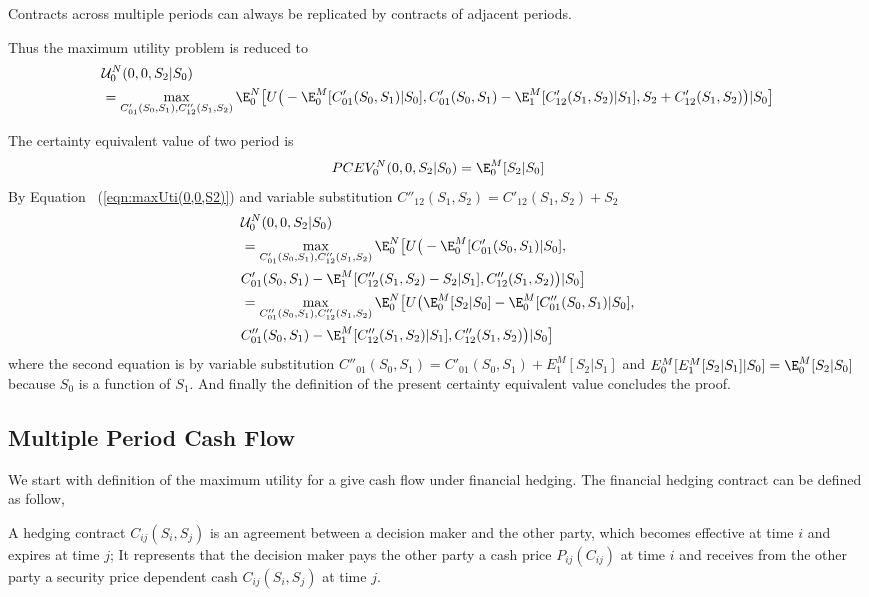 {\remark Contracts across multiple periods can always be replicated by contracts of adjacent periods.}

Thus the maximum utility problem is reduced to
\begin{align} \label{eqn:maxUti(0,0,S2)}
&\mathcal{U}^N_0 (0,0, S_2|S_0)\nonumber \\&= \max_{C'_{01}(S_0,S_1),C''_{12}(S_1,S_2)} \E_0^N \big{[}U\big{(} - \E_0^M[C'_{01}(S_0,S_1)|S_0] , C'_{01}(S_0,S_1) - \E_1^M[C'_{12}(S_1,S_2)|S_1], S_2+C'_{12}(S_1,S_2)\big{)} |S_0\big{]} 
\end{align}


{\lemma The certainty equivalent value of two period is
\[PCEV_0^N(0,0,S_2|S_0) = \E_0^M[S_2|S_0] \]
}
\proof By Equation~ (\ref{eqn:maxUti(0,0,S2)}) and variable substitution $C''_{12}(S_1,S_2) = C'_{12}(S_1,S_2) + S_2$
\begin{align*}
&\mathcal{U}^N_0 (0,0, S_2|S_0)\nonumber \\&= \max_{C'_{01}(S_0,S_1),C''_{12}(S_1,S_2)} \E_0^N \big{[}U\big{(} - \E_0^M[C'_{01}(S_0,S_1)|S_0] ,\\& C'_{01}(S_0,S_1) - \E_1^M[C''_{12}(S_1,S_2)-S_2|S_1], C''_{12}(S_1,S_2)\big{)} |S_0\big{]} \\
& = \max_{C''_{01}(S_0,S_1),C''_{12}(S_1,S_2)} \E_0^N \big{[}U\big{(} \E_0^M[S_2|S_0]- \E_0^M[C''_{01}(S_0,S_1)|S_0] , \\&C''_{01}(S_0,S_1) - \E_1^M[C''_{12}(S_1,S_2)|S_1], C''_{12}(S_1,S_2)\big{)} |S_0\big{]}
\end{align*}
where the second equation is by variable substitution $C''_{01}(S_0,S_1) = C'_{01}(S_0,S_1) + E_1^M[S_2|S_1]$ and $E_0^M[E_1^M[S_2|S_1]|S_0] = \E_0^M[S_2|S_0]$ because $S_0$ is a function of $S_1$.  And finally the definition of the present certainty equivalent value concludes the proof.
\endproof

\subsection{Multiple Period Cash Flow}
We start with definition of the maximum utility for a give cash flow under financial hedging.  The financial hedging contract can be defined as follow,

{ A hedging contract $C_{ij}(S_i,S_j)$ is an agreement between a decision maker and the other party, which becomes effective at time $i$ and expires at time $j$; It represents that the decision maker pays the other party a  cash price $P_{ij}(C_{ij})$ at time $i$ and receives from the other party a security price dependent cash $C_{ij}(S_i,S_j)$ at time $j$.  }


